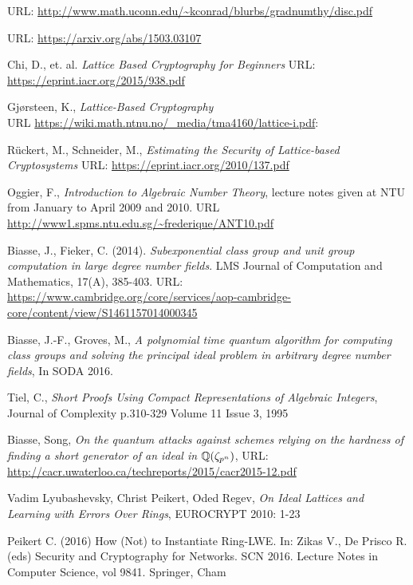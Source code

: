 \begin{thebibliography}{99}
URL: \url{http://www.math.uconn.edu/~kconrad/blurbs/gradnumthy/disc.pdf}

URL: \url{https://arxiv.org/abs/1503.03107}

 Chi, D., et. al. \emph{Lattice Based Cryptography for Beginners}  URL: \url{https://eprint.iacr.org/2015/938.pdf}

 Gjørsteen, K., \emph{Lattice-Based Cryptography} \\URL \url{https://wiki.math.ntnu.no/_media/tma4160/lattice-i.pdf}:

 Rückert, M., Schneider, M., \emph{Estimating the Security of Lattice-based Cryptosystems} URL: \url{https://eprint.iacr.org/2010/137.pdf}

 Oggier, F., \emph{Introduction to Algebraic Number Theory}, lecture notes given at NTU from January to April 2009 and 2010. URL \url{http://www1.spms.ntu.edu.sg/~frederique/ANT10.pdf}

 Biasse, J., Fieker, C. (2014). \emph{Subexponential class group and unit group computation in large degree number fields}. LMS Journal of Computation and Mathematics, 17(A), 385-403. URL: \url{https://www.cambridge.org/core/services/aop-cambridge-core/content/view/S1461157014000345}

 Biasse, J.-F., Groves, M., \emph{A polynomial time quantum algorithm for computing class groups and solving the principal ideal problem in arbitrary degree number fields}, In SODA 2016.

 Tiel, C., \emph{Short Proofs Using Compact Representations of Algebraic Integers}, Journal of Complexity p.310-329 Volume 11 Issue 3, 1995

 Biasse, Song, \emph{On the quantum attacks against schemes relying on the hardness of finding a short generator of an ideal in \(\mathbb{Q}(\zeta_{p^n})\)}, URL: \url{http://cacr.uwaterloo.ca/techreports/2015/cacr2015-12.pdf}

 Vadim Lyubashevsky, Christ Peikert, Oded Regev, \emph{On Ideal Lattices and Learning with Errors Over Rings}, EUROCRYPT 2010: 1-23

 Peikert C. (2016) How (Not) to Instantiate Ring-LWE. In: Zikas V., De Prisco R. (eds) Security and Cryptography for Networks. SCN 2016. Lecture Notes in Computer Science, vol 9841. Springer, Cham


\end{thebibliography}
